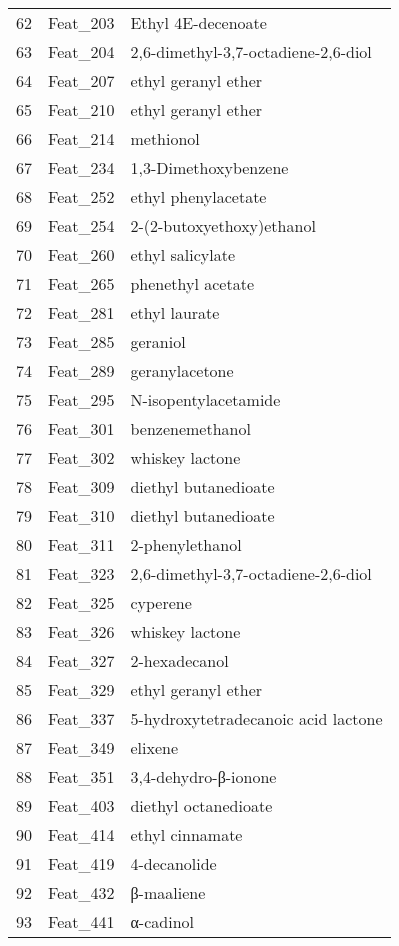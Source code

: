 \begin{table}[ht]
\begin{tabular}{rll}
  62 & Feat\_203 & Ethyl 4E-decenoate \\ 
  63 & Feat\_204 & 2,6-dimethyl-3,7-octadiene-2,6-diol \\ 
  64 & Feat\_207 & ethyl geranyl ether \\ 
  65 & Feat\_210 & ethyl geranyl ether \\ 
  66 & Feat\_214 & methionol \\ 
  67 & Feat\_234 & 1,3-Dimethoxybenzene \\ 
  68 & Feat\_252 & ethyl phenylacetate \\ 
  69 & Feat\_254 & 2-(2-butoxyethoxy)ethanol \\ 
  70 & Feat\_260 & ethyl salicylate \\ 
  71 & Feat\_265 & phenethyl acetate  \\ 
  72 & Feat\_281 & ethyl laurate \\ 
  73 & Feat\_285 & geraniol \\ 
  74 & Feat\_289 & geranylacetone \\ 
  75 & Feat\_295 & N-isopentylacetamide \\ 
  76 & Feat\_301 & benzenemethanol \\ 
  77 & Feat\_302 & whiskey lactone \\ 
  78 & Feat\_309 & diethyl butanedioate \\ 
  79 & Feat\_310 & diethyl butanedioate \\ 
  80 & Feat\_311 & 2-phenylethanol \\ 
  81 & Feat\_323 & 2,6-dimethyl-3,7-octadiene-2,6-diol \\ 
  82 & Feat\_325 & cyperene \\ 
  83 & Feat\_326 & whiskey lactone \\ 
  84 & Feat\_327 & 2-hexadecanol \\ 
  85 & Feat\_329 & ethyl geranyl ether \\ 
  86 & Feat\_337 & 5-hydroxytetradecanoic acid lactone \\ 
  87 & Feat\_349 & elixene \\ 
  88 & Feat\_351 & 3,4-dehydro-β-ionone \\ 
  89 & Feat\_403 & diethyl octanedioate \\ 
  90 & Feat\_414 & ethyl cinnamate \\ 
  91 & Feat\_419 & 4-decanolide \\ 
  92 & Feat\_432 & β-maaliene \\ 
  93 & Feat\_441 & α-cadinol \\ 

\end{tabular}
\end{table}
